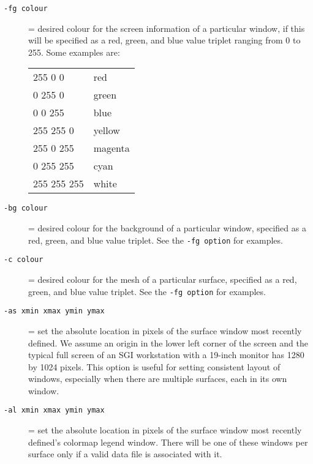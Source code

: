 \begin{description}
    
  \item[{\tt-fg colour}]
    = desired colour for the screen information of a particular 
    window, if this will be   
    specified as a red, green, and blue value triplet ranging from 
    0 to 255.  Some examples are:\\
    \begin{center}
        \begin{tabular}{|l|l|} \hline
            255 0 0     & red \\
            0 255 0     & green\\
            0 0 255     & blue\\
            255 255 0   & yellow\\
            255 0 255   & magenta  \\
            0 255 255   & cyan \\
            255 255 255 & white  \\ \hline
        \end{tabular}
    \end{center}
    
  \item[{\tt-bg colour}]
    = desired colour for the background of a particular window,
    specified as a red, green, and blue value triplet.  
    See the {\tt-fg option} for examples.
    
  \item[{\tt-c colour}]
    = desired colour for the mesh of a particular surface,
    specified as a red, green, and blue value triplet.  
    See the {\tt-fg option} for examples.
    
    
  \item[{\tt-as xmin xmax ymin ymax}] = set the absolute location in
    pixels of the surface window most recently defined.  We
    assume an origin in the lower left corner of the screen and
    the typical full screen of an SGI workstation with a 19-inch
    monitor has 1280 by 1024 pixels.  This option is useful for
    setting consistent layout of windows, especially when
    there are multiple surfaces, each in its own window.
    
  \item[{\tt-al xmin xmax ymin ymax}] = set the absolute location in 
    pixels of the surface window most recently defined's colormap
    legend window.  There will be one of these windows per
    surface only if a valid data file is associated with it.
    

\end{description}
